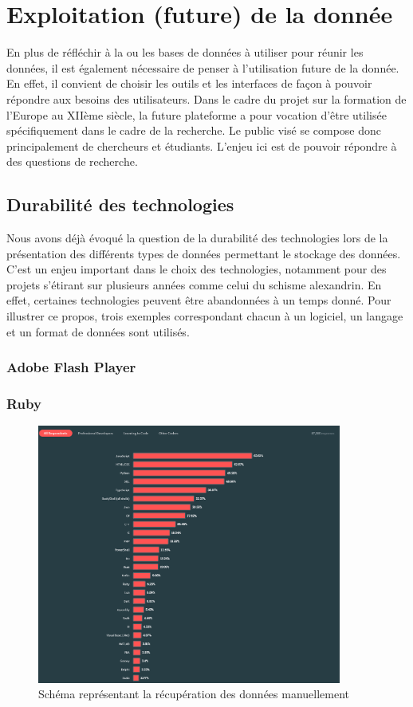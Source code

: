    \chapter{Exploitation (future) de la donnée}

En plus de réfléchir à la ou les bases de données à utiliser pour réunir les données, il est également nécessaire de penser à l’utilisation future de la donnée. En effet, il convient de choisir les outils et les interfaces de façon à pouvoir répondre aux besoins des utilisateurs. Dans le cadre du projet sur la formation de l’Europe au XIIème siècle, la future plateforme a pour vocation d’être utilisée spécifiquement dans le cadre de la recherche. Le public visé se compose donc principalement de chercheurs et étudiants. L’enjeu ici est de pouvoir répondre à des questions de recherche.


    \section{Durabilité des technologies}

Nous avons déjà évoqué la question de la durabilité des technologies lors de la présentation des différents types de données permettant le stockage des données. C’est un enjeu important dans le choix des technologies, notamment pour des projets s’étirant sur plusieurs années comme celui du schisme alexandrin.
En effet, certaines technologies peuvent être abandonnées à un temps donné. Pour illustrer ce propos, trois exemples correspondant chacun à un logiciel, un langage et un format de données sont utilisés.


    \subsection{Adobe Flash Player}
    \subsection{Ruby}

\begin{figure}[h]
    \centering
    \includegraphics[width=10cm]{images/extrait_sondage_stackoverflow_languages.png}
    \caption{Schéma représentant la récupération des données manuellement}
    \label{fig:schemadonneessauvegarde}
\end{figure}
    
